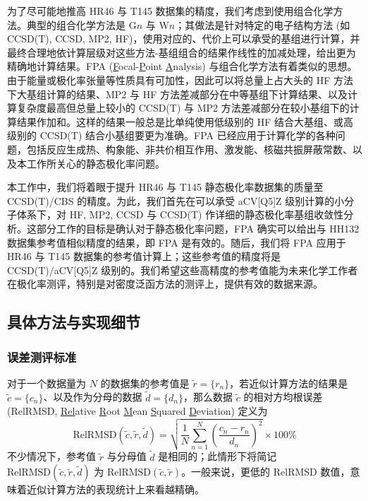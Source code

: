 为了尽可能地推高 HR46 与 T145 数据集的精度，我们考虑到使用组合化学方法。典型的组合化学方法是 G$n$\cite{Pople-Curtiss.JCP.1989, Curtiss-Pople.JCP.1990, Curtiss-Pople.JCP.1991, Curtiss-Pople.JCP.1998, Curtiss-Raghavachari.JCP.2007} 与 W$n$\cite{Martin-Oliveira.JCP.1999, Parthiban-Martin.JCP.2001}；其做法是针对特定的电子结构方法 (如 CCSD(T), CCSD, MP2, HF)，使用对应的、代价上可以承受的基组进行计算，并最终合理地依计算层级对这些方法-基组组合的结果作线性的加减处理，给出更为精确地计算结果。FPA (\underline{F}ocal-\underline{P}oint \underline{A}nalysis) 与组合化学方法有着类似的思想\cite{East-Allen.JCP.1993}。由于能量或极化率张量等性质具有可加性，因此可以将总量上占大头的 HF 方法下大基组计算的结果、MP2 与 HF 方法差减部分在中等基组下计算结果、以及计算复杂度最高但总量上较小的 CCSD(T) 与 MP2 方法差减部分在较小基组下的计算结果作加和。这样的结果一般总是比单纯使用低级别的 HF 结合大基组、或高级别的 CCSD(T) 结合小基组要更为准确。FPA 已经应用于计算化学的各种问题，包括反应生成热\cite{East-Allen.JCP.1993, Nielsen-Schaefer.JCP.1997}、构象能\cite{Csaszar-Schaefer.JCP.1998, Tschumper-Tschumper.JCP.2001, Kahn-Kahn.JCC.2008}、非共价相互作用\cite{Tschumper-Quack.JCP.2002, Jurecka-Hobza.PCCP.2006, Marshall-Sherrill.JCP.2011}、激发能\cite{Bokareva-Godunov.IJQC.2008}、核磁共振屏蔽常数\cite{Sun-Xu.JCP.2013, Wang-Xu.JCP.2018}、以及本工作所关心的静态极化率问题\cite{Huzak-Deleuze.JCP.2013, Monten-Deleuze.MP.2011}。

本工作中，我们将着眼于提升 HR46 与 T145 静态极化率数据集的质量至 CCSD(T)/CBS 的精度。为此，我们首先在可以承受 aCV[Q5]Z 级别计算的小分子体系下，对 HF, MP2, CCSD 与 CCSD(T) 作详细的静态极化率基组收敛性分析。这部分工作的目标是确认对于静态极化率问题，FPA 确实可以给出与 HH132 数据集参考值相似精度的结果，即 FPA 是有效的。随后，我们将 FPA 应用于 HR46 与 T145 数据集的参考值计算上；这些参考值的精度将是 CCSD(T)/aCV[Q5]Z 级别的。我们希望这些高精度的参考值能为未来化学工作者在极化率测评，特别是对密度泛函方法的测评上，提供有效的数据来源。

\subsection{具体方法与实现细节}

\subsubsection{误差测评标准}

对于一个数据量为 $N$ 的数据集的参考值是 $\tilde r = \{ r_n \}$，若近似计算方法的结果是 $\tilde c = \{ c_n \}$、以及作为分母的数据 $\tilde d = \{ d_n \}$，那么数据 $\tilde c$ 的相对方均根误差 (RelRMSD, \underline{Rel}ative \underline{R}oot \underline{M}ean \underline{S}quared \underline{D}eviation) 定义为
\begin{equation}
    \text{RelRMSD} (\tilde c, \tilde r, \tilde d) = \sqrt{\frac{1}{N} \sum_{n = 1}^N \left( \frac{c_n - r_n}{d_n} \right)^2} \times 100\%
\end{equation}
不少情况下，参考值 $\tilde r$ 与分母值 $\tilde d$ 是相同的；此情形下将简记 $\text{RelRMSD} (\tilde c, \tilde r, \tilde d)$ 为 $\text{RelRMSD} (\tilde c, \tilde r)$。一般来说，更低的 RelRMSD 数值，意味着近似计算方法的表现统计上来看越精确。

